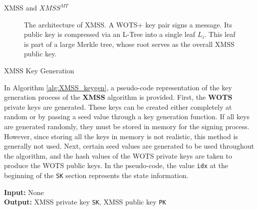 \begin{section}{XMSS and $XMSS^{MT}$}
\begin{figure}[h]
\caption{The architecture of XMSS. A WOTS+ key pair signs a message. Its public key is compressed via an L-Tree into a single leaf $L_i$. This leaf is part of a large Merkle tree, whose root serves as the overall XMSS public key.}
\label{fig:xmss}
\end{figure}


    \begin{subsection}{XMSS Key Generation}

        In Algorithm \ref{alg:XMSS_keygen}, a pseudo-code representation of the key generation process of the \textbf{XMSS} algorithm is provided. First, the \textbf{WOTS} private keys are generated. These keys can be created either completely at random or by passing a seed value through a key generation function. If all keys are generated randomly, they must be stored in memory for the signing process. However, since storing all the keys in memory is not realistic, this method is generally not used. Next, certain seed values are generated to be used throughout the algorithm, and the hash values of the WOTS private keys are taken to produce the WOTS public keys. In the pseudo-code, the value \texttt{idx} at the beginning of the \texttt{SK} section represents the state information.

        \begin{algorithm}
\caption{XMSS\_keyGen -- Generate an XMSS key pair}
\label{alg:XMSS_keygen}

\textbf{Input:} None \\
\textbf{Output:} XMSS private key \texttt{SK}, XMSS public key \texttt{PK}

\vspace{0.3cm}


\end{algorithm}
\end{subsection}
\end{section}
